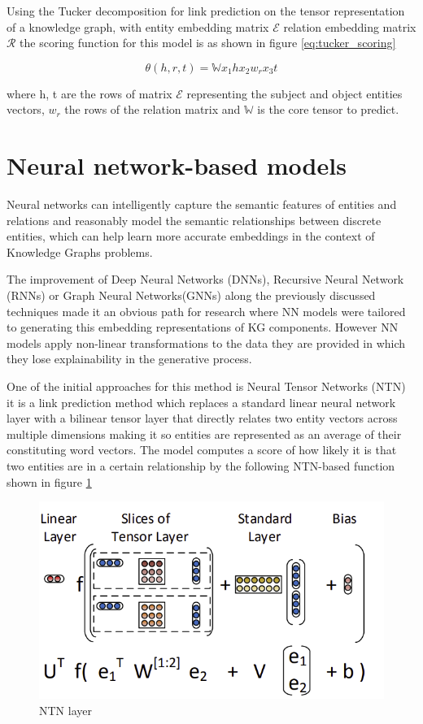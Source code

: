 Using the Tucker decomposition for link prediction on the tensor representation of a knowledge graph, with entity embedding matrix $\mathcal{E}$ relation embedding matrix $\mathcal{R}$ the scoring function for this model is as shown in figure \ref{eq:tucker_scoring}

\begin{equation}
    \label{eq:tucker_scoring}
    \theta (h, r, t) = \mathbb{W} x_1 h x_2 w_r x_3 t
\end{equation}

where h, t are the rows of matrix $\mathcal{E}$ representing the subject and object entities vectors, $w_r$ the rows of the relation matrix and $\mathbb{W}$ is the core tensor to predict.

\section{Neural network-based models}\label{sec:emb-nn}

Neural networks can intelligently capture the semantic features of entities and relations and reasonably model the semantic relationships between discrete entities, which can help learn more accurate embeddings in the context of Knowledge Graphs problems. 

The improvement of Deep Neural Networks (DNNs), Recursive Neural Network (RNNs) or Graph Neural Networks(GNNs) along the previously discussed techniques made it an obvious path for research where NN models were tailored to generating this embedding representations of KG components. However NN models apply non-linear transformations to the data they are provided in which they lose explainability in the generative process.

One of the initial approaches for this method is Neural Tensor Networks (NTN) \cite{} it is a link prediction method which replaces a standard linear neural network layer with a bilinear tensor layer that directly relates two entity vectors across multiple dimensions making it so entities are represented as an average of their constituting word vectors. The model computes a score of how likely it is that two entities are in a certain relationship by the following NTN-based function shown in figure \ref{fig:emb-ntn}

\begin{figure}[!ht]
    \centering
    \includegraphics[width=.65\textwidth]{fig/embeddings/NTN.png}
    \caption{NTN layer}
    \label{fig:emb-ntn}
\end{figure}

